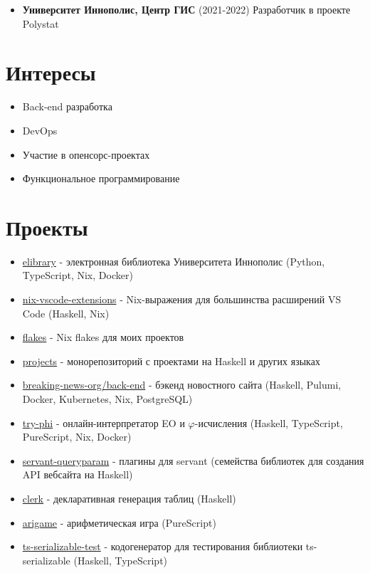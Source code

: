 \documentclass[twocolumn,11pt]{report}
\begin{document}
\begin{itemize}
     \item \textbf{Университет Иннополис, Центр ГИС} (2021-2022) \newline
           Разработчик в проекте Polystat
\end{itemize}

\newpage

\section*{Интересы}
\begin{itemize}
     \itemsep0em
     \item Back-end разработка
     \item DevOps
     \item Участие в опенсорс-проектах
     \item Функциональное программирование
\end{itemize}

\section*{Проекты}
\begin{itemize}
     \itemsep0em
     \item \href{https://github.com/deemp/elibrary#readme}{elibrary} - электронная библиотека Университета Иннополис (Python, TypeScript, Nix, Docker)
     \item \href{https://github.com/nix-community/nix-vscode-extensions#readme}{nix-vscode-extensions} - Nix-выражения для большинства расширений VS Code (Haskell, Nix)
     \item \href{https://github.com/deemp/flakes#readme}{flakes} - Nix flakes для моих проектов
     \item \href{https://github.com/deemp/projects#readme}{projects} - монорепозиторий с проектами на Haskell и других языках
     \item \href{https://github.com/breaking-news-org/back-end#readme}{breaking-news-org/back-end} - бэкенд новостного сайта (Haskell, Pulumi, Docker, Kubernetes, Nix, PostgreSQL)
     \item \href{https://github.com/objectionary/try-phi#readme}{try-phi} - онлайн-интерпретатор EO и $\varphi$-исчисления (Haskell, TypeScript, PureScript, Nix, Docker)
     \item \href{https://github.com/deemp/servant-queryparam#readme}{servant-queryparam} - плагины для servant (семейства библиотек для создания API вебсайта на Haskell)
     \item \href{https://github.com/deemp/clerk#readme}{clerk} - декларативная генерация таблиц (Haskell)
     \item \href{https://github.com/deemp/arigame#readme}{arigame} - арифметическая игра (PureScript)
     \item \href{https://github.com/deemp/projects/tree/main/haskell/ts-serializable-test#readme}{ts-serializable-test} - кодогенератор для тестирования библиотеки ts-serializable (Haskell, TypeScript)
\end{itemize}
\end{document}
